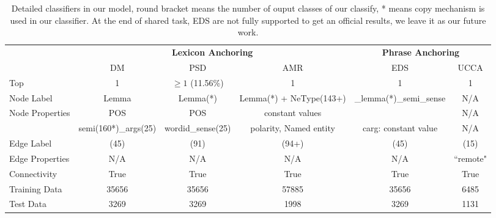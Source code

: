 \begin{table*}[!ht]
\begin{center}
\setlength{\tabcolsep}{2.5pt}
\small
\begin{tabular}{l|ccc|cc}
\toprule
\hline
                                 & \multicolumn{3}{c}{{\bf Lexicon Anchoring}} & \multicolumn{2}{c}{{\bf Phrase Anchoring}}                                        \\ \cline{2-4} \cline{5-6}
                                 & DM                                          & PSD               & AMR                     & EDS                     & UCCA      \\ \hline
Top                              & 1                                           & $ \geq 1$ (11.56\%)  & 1                       & 1                       & 1         \\ \hline
Node Label                       & Lemma                                       & Lemma(*)          & Lemma(*) + NeType(143+) & \_lemma(*)\_semi\_sense & N/A       \\ \hline
\multirow{2}{*}{Node Properties} & POS                                         & POS               & constant values         &                         & N/A       \\
                                 & semi(160*)\_args(25)                        & wordid\_sense(25) & polarity, Named entity  & carg: constant value    & N/A       \\ \hline
Edge Label                       & (45)                                        & (91)              & (94+)                   & (45)                    & (15)      \\ \hline
Edge Properties                  & N/A                                         & N/A               & N/A                     & N/A                     & ``remote" \\ \hline
Connectivity                     & True                                        & True              & True                    & True                    & True      \\ \hline
Training Data                    & 35656                                       & 35656             & 57885                   & 35656                   & 6485      \\ \hline
Test Data                        & 3269                                        & 3269              & 1998                    & 3269                    & 1131      \\ \hline \bottomrule
\end{tabular}
\end{center}
\caption{Detailed classifiers in our model, round bracket means the
  number of ouput classes of our classify, * means copy mechanism is
  used in our classifier. At the end of shared task, EDS are not fully supported to get an official results, we leave it as our future work.}
\label{tbl:summary_impl}
\end{table*}



